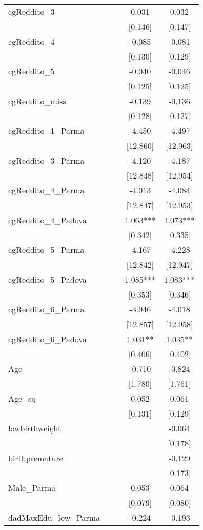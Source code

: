 \documentclass[]{article}
\begin{document}
\begin{tabular}{lcccc}
cgReddito\_3 &  &  & 0.031 & 0.032 \\
 &  &  & [0.146] & [0.147] \\
cgReddito\_4 &  &  & -0.085 & -0.081 \\
 &  &  & [0.130] & [0.129] \\
cgReddito\_5 &  &  & -0.040 & -0.046 \\
 &  &  & [0.125] & [0.125] \\
cgReddito\_miss &  &  & -0.139 & -0.136 \\
 &  &  & [0.128] & [0.127] \\
cgReddito\_1\_Parma &  &  & -4.450 & -4.497 \\
 &  &  & [12.860] & [12.963] \\
cgReddito\_3\_Parma &  &  & -4.120 & -4.187 \\
 &  &  & [12.848] & [12.954] \\
cgReddito\_4\_Parma &  &  & -4.013 & -4.084 \\
 &  &  & [12.847] & [12.953] \\
cgReddito\_4\_Padova &  &  & 1.063*** & 1.073*** \\
 &  &  & [0.342] & [0.335] \\
cgReddito\_5\_Parma &  &  & -4.167 & -4.228 \\
 &  &  & [12.842] & [12.947] \\
cgReddito\_5\_Padova &  &  & 1.085*** & 1.083*** \\
 &  &  & [0.353] & [0.346] \\
cgReddito\_6\_Parma &  &  & -3.946 & -4.018 \\
 &  &  & [12.857] & [12.958] \\
cgReddito\_6\_Padova &  &  & 1.031** & 1.035** \\
 &  &  & [0.406] & [0.402] \\
Age &  &  & -0.710 & -0.824 \\
 &  &  & [1.780] & [1.761] \\
Age\_sq &  &  & 0.052 & 0.061 \\
 &  &  & [0.131] & [0.129] \\
lowbirthweight &  &  &  & -0.064 \\
 &  &  &  & [0.178] \\
birthpremature &  &  &  & -0.129 \\
 &  &  &  & [0.173] \\
Male\_Parma &  &  & 0.053 & 0.064 \\
 &  &  & [0.079] & [0.080] \\
dadMaxEdu\_low\_Parma &  &  & -0.224 & -0.193 \\

\end{tabular}
\end{document}
